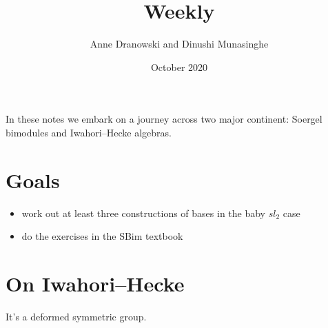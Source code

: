 \documentclass{article}
\title{Weekly}
\author{Anne Dranowski and Dinushi Munasinghe}
\date{October 2020}
\begin{document}
\maketitle

In these notes we embark on a journey across two major continent: Soergel bimodules and Iwahori--Hecke algebras. 

\section*{Goals}

\begin{itemize}
    \item work out at least three constructions of bases in the baby $sl_2$ case 
    \item do the exercises in the SBim textbook
\end{itemize}

% 

\section*{On Iwahori--Hecke}

It's a deformed symmetric group.
\end{document}
